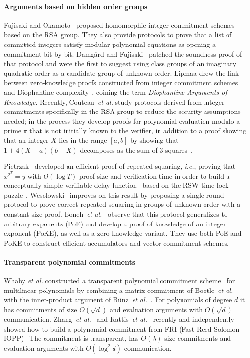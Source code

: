 \paragraph{Arguments based on hidden order groups} 
Fujisaki and Okamoto~\cite{C:FujOka97} proposed homomorphic integer commitment schemes based on the RSA group. They also provide protocols to prove that a list of committed integers satisfy modular polynomial equations as opening a commitment bit by bit. Damgård and Fujisaki~\cite{AC:DamFuj02} patched the soundness proof of that protocol and were the first to suggest using class groups of an imaginary quadratic order as a candidate group of unknown order. Lipmaa drew the link between zero-knowledge proofs constructed from integer commitment schemes and Diophantine complexity~\cite{AC:Lipmaa03a}, coining the term \emph{Diophantine Arguments of Knowledge}. Recently, Couteau~\emph{et al.} study protocols derived from integer commitments specifically in the RSA group to reduce the security assumptions needed; in the process they develop proofs for polynomial evaluation modulo a prime $\pi$ that is not initially known to the verifier, in addition to a proof showing that an integer $X$ lies in the range $[a,b]$ by showing that $1+4(X-a)(b-X)$ decomposes as the sum of 3 squares~\cite{EC:CouPetPoi17}.

Pietrzak~\cite{ITCS:Pietrzak18} developed an efficient proof of repeated squaring, \emph{i.e.}, proving that $x^{2^T} = y$ with $O(\log T)$ proof size and verification time in order to build a conceptually simple verifiable delay function~\cite{C:BBBF18} based on the RSW time-lock puzzle~\cite{RivShaWag96}. Wesolowski~\cite{EC:Wesolowski19} improves on this result by proposing a single-round protocol to prove correct repeated squaring in groups of unknown order with a constant size proof. Boneh~\emph{et al.}~\cite{C:BonBunFis19} observe that this protocol generalizes to arbitrary exponents (PoE) and develop a proof of knowledge of an integer exponent (PoKE), as well as a zero-knowledge variant. They use both PoE and PoKE to construct efficient accumulators and vector commitment schemes.

\paragraph{Transparent polynomial commitments} 
Whaby \emph{et al.} constructed a transparent polynomial commitment scheme~\cite{SP:WTSTW18} for multilinear polynomials by combining a matrix commitment of Bootle~\emph{et al.}~\cite{EC:BCCGP16} with the inner-product argument of B\"{u}nz~\emph{et al.}~\cite{SP:BBBPWM18}. For polynomials of degree $d$ it has commitments of size  $O(\sqrt{d})$ and evaluation arguments with $O(\sqrt{d})$ communication.
Zhang~\emph{et al.}~\cite{EPRINT:ZXZS19} and Kattis~\emph{et al.}~\cite{EPRINT:KatPanVla19} recently and independently showed how to build a polynomial commitment from FRI (Fast Reed Solomon IOPP)~\cite{ICALP:BBHR18,ECCC:BGKS19}
The commitment is transparent, has $O(\lambda)$ size commitments and evaluation arguments with $O(\log^2 d)$ communication.
